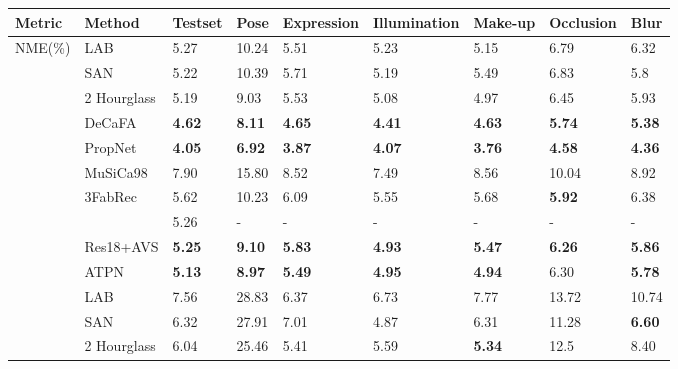 \documentclass[3p,twocolumn, round, sort & compress]{elsarticle}
\begin{document}
\begin{table*}[t!]
	\centering
	\begin{tabular}{m{1.4cm}<{\centering}|m{3.8cm}<{\centering}|m{0.8cm}<{\centering}|m{0.7cm}<{\centering}|m{1.4cm}<{\centering}|m{1.5cm}<{\centering}|m{1.3cm}<{\centering}|m{1.2cm}<{\centering}|m{0.7cm}<{\centering}}
		\hline
		Metric & Method & Testset & Pose  & Expression & Illumination & Make-up & Occlusion & Blur \\ \hline
		\multirow{18}{*}{NME(\%)} 
		& LAB \citep{LAB} & 5.27 & 10.24 & 5.51 & 5.23 & 5.15 & 6.79  & 6.32  \\
		& SAN \citep{SAN} & 5.22 & 10.39 & 5.71 & 5.19 & 5.49 & 6.83 & 5.8  \\
		& 2 Hourglass \citep{Hourglass} & 5.19 & 9.03 & 5.53 & 5.08 & 4.97 & 6.45 & 5.93 \\
		& DeCaFA \citep{DeCaFA} & {\color{blue} \textbf{4.62}} & {\color{blue} \textbf{8.11}} & {\color{blue} \textbf{4.65}} & {\color{blue} \textbf{4.41}} & {\color{blue} \textbf{4.63}} & {\color{blue} \textbf{5.74}} & {\color{blue} \textbf{5.38}}  \\
		& PropNet \citep{PropNet}  & {\color{red} \textbf{4.05}} & {\color{red} \textbf{6.92}} & {\color{red} \textbf{3.87}} & {\color{red} \textbf{4.07}} & {\color{red} \textbf{3.76}} & {\color{red} \textbf{4.58}} & {\color{red} \textbf{4.36}} \\ \cline{2-9}
		& MuSiCa98 \citep{KWTQ} & 7.90 & 15.80 & 8.52 & 7.49 & 8.56 & 10.04 & 8.92 \\
		& 3FabRec \citep{3FabRec} & 5.62 & 10.23 & 6.09 & 5.55 & 5.68 & {\color{red} \textbf{5.92}} & 6.38 \\
		& \citep{RFA} & 5.26 & - & - & - & - & - & -\\
		& Res18+AVS \citep{AVS} & {\color{blue} \textbf{5.25}} & {\color{blue} \textbf{9.10}} & {\color{blue} \textbf{5.83}} & {\color{red} \textbf{4.93}} & {\color{blue} \textbf{5.47}} & {\color{blue} \textbf{6.26}} & {\color{blue} \textbf{5.86}} \\
		& ATPN & {\color{red} \textbf{5.13}} & {\color{red} \textbf{8.97}} & {\color{red} \textbf{5.49}} & {\color{blue} \textbf{4.95}} & {\color{red} \textbf{4.94}} & 6.30 & {\color{red} \textbf{5.78}} \\ \hline
		\multirow{10}{*}{FR(\%)} 
		& LAB & 7.56 & 28.83 & 6.37 & 6.73 & 7.77 & 13.72 & 10.74 \\
		& SAN & 6.32 & 27.91 & 7.01 & 4.87 & 6.31 & 11.28 & {\color{blue} \textbf{6.60}}   \\
		& 2 Hourglass & 6.04 & 25.46 & 5.41 & 5.59 & {\color{blue} \textbf{5.34}} & 12.5 & 8.40   \\

\end{tabular}
\end{table*}
\end{document}
